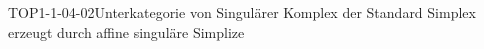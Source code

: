 
\begin{DEF}{TOP1-1-04-02}{Unterkategorie von Singulärer Komplex der Standard Simplex erzeugt durch affine singuläre Simplize}
\end{DEF}
